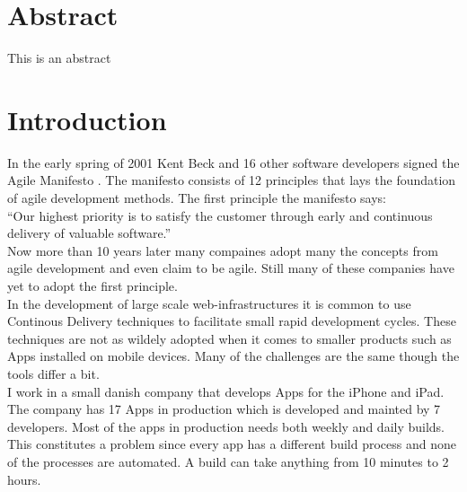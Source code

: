 \documentclass{ituthesis}
\begin{document}

\frontmatter

\thetitlepage

\chapter*{Abstract}
This is an abstract

\clearpage
\setcounter{tocdepth}{1}

\mainmatter

\midsloppy
\sloppybottom

\chapter{Introduction}

In the early spring of 2001 Kent Beck and 16 other software developers signed the Agile Manifesto \cite{beck2001agile}. The manifesto consists of 12 principles that lays the foundation of agile development methods. The first principle the manifesto says:\\

``Our highest priority is to satisfy the customer through early and continuous delivery
of valuable software.'' \cite{beck2001agile}\\

Now more than 10 years later many compaines adopt many the concepts from agile development and even claim to be agile. Still many of these companies have yet to adopt the first principle.\\

In the development of large scale web-infrastructures it is common to use Continous Delivery techniques to facilitate small rapid development cycles. These techniques are not as wildely adopted when it comes to smaller products such as Apps installed on mobile devices. Many of the challenges are the same though the tools differ a bit.\\

I work in a small danish company that develops Apps for the iPhone and iPad. The company has 17 Apps in production which is developed and mainted by 7 developers. Most of the apps in production needs both weekly and daily builds. This constitutes a problem since every app has a different build process and none of the processes are automated. A build can take anything from 10 minutes to 2 hours. \cite{Humble2006}

\end{document}
